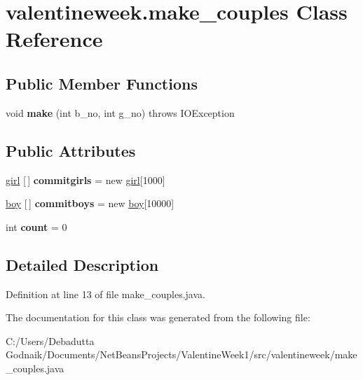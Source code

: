 \hypertarget{classvalentineweek_1_1make__couples}{}\section{valentineweek.\+make\+\_\+couples Class Reference}
\label{classvalentineweek_1_1make__couples}
\subsection*{Public Member Functions}
\begin{DoxyCompactItemize}
\item 
\mbox{\label{classvalentineweek_1_1make__couples_a325016094d784fd6ab4fada335838a9a}} 
void {\bfseries make} (int b\+\_\+no, int g\+\_\+no)  throws I\+O\+Exception     
\end{DoxyCompactItemize}
\subsection*{Public Attributes}
\begin{DoxyCompactItemize}
\item 
\mbox{\label{classvalentineweek_1_1make__couples_ada3a71bbca4402c2b9047257cc5f20d4}} 
\hyperlink{classvalentineweek_1_1girl}{girl} \mbox{[}$\,$\mbox{]} {\bfseries commitgirls} = new \hyperlink{classvalentineweek_1_1girl}{girl}\mbox{[}1000\mbox{]}
\item 
\mbox{\label{classvalentineweek_1_1make__couples_afc5633c9af67e7d22e0f50b3dfbb6c07}} 
\hyperlink{classvalentineweek_1_1boy}{boy} \mbox{[}$\,$\mbox{]} {\bfseries commitboys} = new \hyperlink{classvalentineweek_1_1boy}{boy}\mbox{[}10000\mbox{]}
\item 
\mbox{\label{classvalentineweek_1_1make__couples_a69e827a4f71a99f87887cc5823c42071}} 
int {\bfseries count} = 0
\end{DoxyCompactItemize}


\subsection{Detailed Description}


Definition at line 13 of file make\+\_\+couples.\+java.



The documentation for this class was generated from the following file\+:\begin{DoxyCompactItemize}
\item 
C\+:/\+Users/\+Debadutta Godnaik/\+Documents/\+Net\+Beans\+Projects/\+Valentine\+Week1/src/valentineweek/make\+\_\+couples.\+java\end{DoxyCompactItemize}
